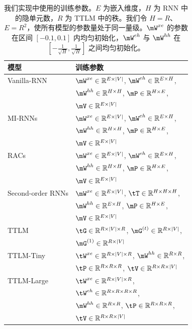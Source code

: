 \documentclass{article}
\theoremstyle{plain}
\theoremstyle{definition}
\theoremstyle{remark}
\begin{document}
\begin{table}[ht] \small
    \centering
    \begin{tabular}{ll}
    \toprule
        模型 & 训练参数 \\
        \midrule
        Vanilla-RNN & $\mW^{xe}\in \mathbb{R}^{E\times |V|}$, $\mW^{eh}\in \mathbb{R}^{E\times H}$, \\
        & $\mW^{hh}\in \mathbb{R}^{H\times H}$, $\mP\in\mathbb{R}^{H\times E}$, \\
        & $\mV\in\mathbb{R}^{E\times|V|}$  \\
        \hline
        MI-RNNs & $\mW^{xe}\in \mathbb{R}^{E\times |V|}$, $\mW^{eh}\in \mathbb{R}^{E\times H}$, \\
        & $\mW^{hh}\in \mathbb{R}^{H\times H}$, $\mP\in\mathbb{R}^{H\times E}$, \\
        & $\mV\in\mathbb{R}^{E\times|V|}$  \\

        \hline
        RACs & $\mW^{xe}\in \mathbb{R}^{E\times |V|}$, $\mW^{eh}\in \mathbb{R}^{E\times H}$, \\
        & $\mW^{hh}\in \mathbb{R}^{H\times H}$, $\mP\in\mathbb{R}^{H\times E}$, \\
        & $\mV\in\mathbb{R}^{E\times|V|}$\\
        \hline
        Second-order RNNs & $\mW^{xe} \in \mathbb{R}^{E\times |V|}$, $\tT \in \mathbb{R}^{H\times H \times H}$, \\
        & $\mW^{hh}\in \mathbb{R}^{E \times H}$, $\mP\in\mathbb{R}^{H\times E}$, \\
        & $\mV\in\mathbb{R}^{E\times|V|}$ \\
        \hline
        TTLM & $\tG\in \mathbb{R}^{R\times |V|\times R}$, $\mG^{(t)}\in \mathbb{R}^{R \times |V|}$, \\

        & $\mG^{(1)} \in \mathbb{R}^{R \times |V|}$ \\
        \hline
        TTLM-Tiny & $\tW^{xe}\in \mathbb{R}^{R\times |V| \times R}$, $\mW^{hh}\in\mathbb{R}^{R\times R}$, \\
        & $\tP\in\mathbb{R}^{R\times R\times R}$, $\tV\in\mathbb{R}^{R\times R\times |V|}$\\

        \hline
        TTLM-Large & $\tW^{xe}\in\mathbb{R}^{R\times |V|\times R}$, \\ & $\tW^{eh}\in\mathbb{R}^{R\times R\times R\times R}$, \\
        & $\mW^{hh}\in\mathbb{R}^{R\times R}$, $\tP\in\mathbb{R}^{R\times R\times R}$, \\
        &  $\tV\in\mathbb{R}^{R\times R\times |V|}$\\
    \bottomrule
    \end{tabular}
    \caption{我们实现中使用的训练参数。$E$ 为嵌入维度，$H$ 为 RNN 中的隐单元数，$R$ 为 TTLM 中的秩。我们令 $H=R$、$E=R^2$，使所有模型的参数量处于同一量级。$\mW^{xe}$ 的参数在区间 $[-0.1,0.1]$ 内均匀初始化，$\mW^{eh}$ 与 $\mW^{hh}$ 在 $[-\frac{1}{\sqrt{H}}, \frac{1}{\sqrt{H}}]$ 之间均匀初始化。}
    \label{tab:my_label}
\end{table}
\end{document}
